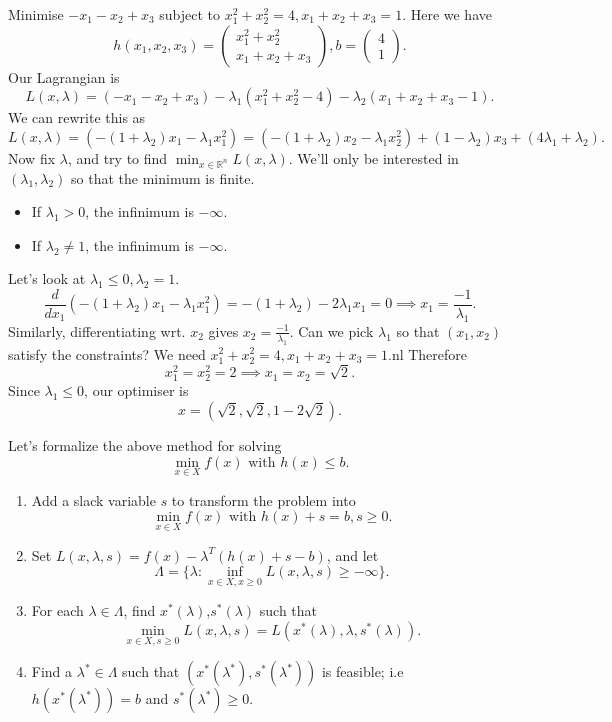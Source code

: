 \documentclass[a4paper]{scrartcl}
\begin{document}
\begin{example}
	Minimise $-x_1-x_2 +x_3 $ subject to $x_1^2+x_2^2=4, x_1 +x_2 +x_3 =1$. Here we have 
	\[h(x_1,x_2,x_3)=\begin{pmatrix}
	x_1^2+x_2^2 \\x_1 +x_2 +x_3
	\end{pmatrix}
	,b=\begin{pmatrix}
	4\\1
	\end{pmatrix}
	 .\]
	Our Lagrangian is 
	\[L(x,\lambda)=(-x_1-x_2+x_3)-\lambda_1(x_1^2+x_2^2-4)-\lambda_2(x_1 +x_2 +x_3 -1).\]
	We can rewrite this as 
	\[L(x,\lambda)=(-(1+\lambda_2)x_1-\lambda_1 x_1^2)= (-(1+\lambda_2)x_2-\lambda_1 x_2^2)+(1-\lambda_2)x_3 + (4\lambda_1+\lambda_2).\]
	Now fix $\lambda$, and try to find $\min_{x \in \mathbb{R}^{n} }L(x,\lambda)$. We'll only be interested in $(\lambda_1,\lambda_2)$ so that the minimum is finite.
	\begin{itemize}
		\item If $\lambda_1>0$, the infinimum is $-\infty$.
		\item If $\lambda_2\neq 1$, the infinimum is $-\infty$.
	\end{itemize}
	Let's look at $\lambda_1\leq 0, \lambda_2=1$.
	\[\frac{d}{dx_1}(-(1+\lambda_2)x_1-\lambda_1 x_1^2)=-(1+\lambda_2)-2\lambda_1 x_1=0 \implies x_1=\frac{-1}{\lambda_1}.\]
	Similarly, differentiating wrt. $x_2$ gives $x_2=\frac{-1}{\lambda_1}$. Can we pick $\lambda_1$ so that $(x_1,x_2)$ satisfy the constraints? We need 
	$x_1^2+x_2^2=4, x_1 +x_2 +x_3 =1$.nl Therefore 
	\[x_1^2=x_2^2=2 \implies x_1=x_2=\sqrt{2}.\] 
	Since $\lambda_1 \leq 0$, our optimiser is 
	\[x=(\sqrt{2},\sqrt{2},1-2 \sqrt{2}).\]
\end{example}

Let's formalize the above method for solving 
\[\min_{x \in X} f(x) \text{ with }  h (x)\leq b.\]
\begin{enumerate}
	\item Add a slack variable $s$ to transform the problem into
	\[\min_{x \in X} f(x) \text{ with } h (x)+s=b, s \geq 0.\]
	\item Set $L (x,\lambda,s)=f(x)-\lambda^T (h(x)+s-b)$, and let 
	\[\Lambda=\{\lambda: \inf_{x \in X, x \geq 0} L(x,\lambda,s)\geq -\infty\}.\]
	\item For each $\lambda \in \Lambda$, find $x^*(\lambda)$,$s^*(\lambda)$ such that 
	\[\min_{x \in X, s \geq 0}L(x,\lambda,s)=L(x^*(\lambda),\lambda,s^*(\lambda)).\]
	\item Find a $\lambda^* \in \Lambda$ such that $(x^* (\lambda^*), s^* (\lambda^*))$ is feasible; i.e $h (x^* (\lambda^*))=b$ and $s^* (\lambda^*)\geq 0$.
\end{enumerate}
\end{document}
